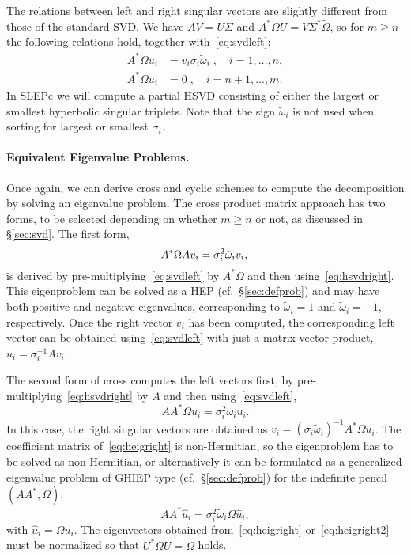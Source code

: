 The relations between left and right singular vectors are slightly different from those of the standard SVD. We have $AV=U\Sigma$ and $A^*\Omega U=V\Sigma^*\tilde\Omega$, so for $m\geq n$ the following relations hold, together with~\eqref{eq:svdleft}:
\begin{align}
\label{eq:hsvdright}
A^*\Omega u_i&=v_i\sigma_i\tilde\omega_i\;,\quad i=1,\ldots,n,\\
\label{eq:hsvdright2}
A^*\Omega u_i&=0\;,\quad i=n+1,\ldots,m.
\end{align}
In SLEPc we will compute a partial HSVD consisting of either the largest or smallest hyperbolic singular triplets. Note that the sign $\tilde\omega_i$ is not used when sorting for largest or smallest $\sigma_i$.

\paragraph{Equivalent Eigenvalue Problems.}
Once again, we can derive cross and cyclic schemes to compute the decomposition by solving an eigenvalue problem. The cross product matrix approach has two forms, to be selected depending on whether $m\geq n$ or not, as discussed in \S\ref{sec:svd}. The first form,
\begin{equation}
\label{eq:heigleft}
A^*\Omega Av_i=\sigma_i^2\tilde\omega_iv_i,\\
\end{equation}
is derived by pre-multiplying~\eqref{eq:svdleft} by $A^*\Omega$ and then using~\eqref{eq:hsvdright}. This eigenproblem can be solved as a HEP (cf.~\S\ref{sec:defprob}) and may have both positive and negative eigenvalues, corresponding to $\tilde\omega_i=1$ and $\tilde\omega_i=-1$, respectively. Once the right vector $v_i$ has been computed, the corresponding left vector can be obtained using~\eqref{eq:svdleft} with just a matrix-vector product, $u_i=\sigma_i^{-1}Av_i$.

The second form of cross computes the left vectors first, by pre-multiplying~\eqref{eq:hsvdright} by $A$ and then using~\eqref{eq:svdleft},
\begin{equation}
\label{eq:heigright}
AA^*\Omega u_i=\sigma_i^2\tilde\omega_iu_i.
\end{equation}
In this case, the right singular vectors are obtained as $v_i=(\sigma_i\tilde\omega_i)^{-1}A^*\Omega u_i$. The coefficient matrix of~\eqref{eq:heigright} is non-Hermitian, so the eigenproblem has to be solved as non-Hermitian, or alternatively it can be formulated as a generalized eigenvalue problem of GHIEP type (cf.~\S\ref{sec:defprob}) for the indefinite pencil $(AA^*,\Omega)$,
\begin{equation}
\label{eq:heigright2}
AA^*\hat{u}_i=\sigma_i^2\tilde\omega_i\Omega \hat{u}_i,
\end{equation}
with $\hat{u}_i=\Omega u_i$. The eigenvectors obtained from~\eqref{eq:heigright} or~\eqref{eq:heigright2} must be normalized so that $U^*\Omega U=\tilde\Omega$ holds.


